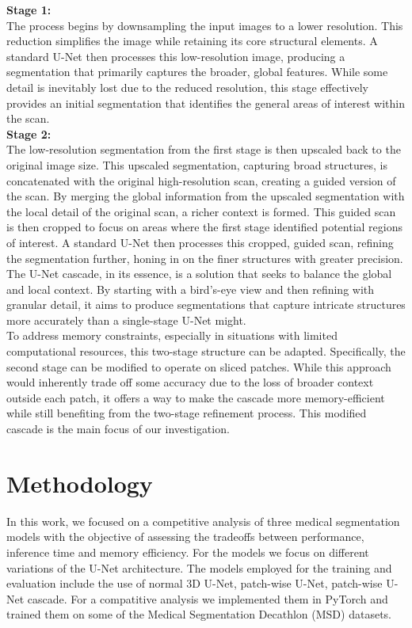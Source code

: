\noindent\textbf{Stage 1:}\\
The process begins by downsampling the input images to a lower resolution. This reduction simplifies the image while retaining its core structural elements.
A standard U-Net then processes this low-resolution image, producing a segmentation that primarily captures the broader, global features.
While some detail is inevitably lost due to the reduced resolution,
this stage effectively provides an initial segmentation that identifies the general areas of interest within the scan.\\[1ex]
\noindent\textbf{Stage 2:}\\
The low-resolution segmentation from the first stage is then upscaled back to the original image size. This upscaled segmentation, capturing broad structures,
is concatenated with the original high-resolution scan, creating a guided version of the scan.
By merging the global information from the upscaled segmentation with the local detail of the original scan, a richer context is formed.
This guided scan is then cropped to focus on areas where the first stage identified potential regions of interest.
A standard U-Net then processes this cropped, guided scan, refining the segmentation further, honing in on the finer structures with greater precision.\\[1ex]
The U-Net cascade, in its essence, is a solution that seeks to balance the global and local context.
By starting with a bird's-eye view and then refining with granular detail,
it aims to produce segmentations that capture intricate structures more accurately than a single-stage U-Net might.\\[1ex]
To address memory constraints, especially in situations with limited computational resources, this two-stage structure can be adapted. Specifically,
the second stage can be modified to operate on sliced patches.
While this approach would inherently trade off some accuracy due to the loss of broader context outside each patch,
it offers a way to make the cascade more memory-efficient while still benefiting from the two-stage refinement process.
This modified cascade is the main focus of our investigation.

\chapter{Methodology}
In this work, we focused on a competitive analysis of three medical segmentation models with the objective of assessing the tradeoffs between performance, inference time and memory efficiency.
For the models we focus on different variations of the U-Net architecture. The models employed for the training and evaluation include the use of normal 3D U-Net, patch-wise U-Net,
patch-wise U-Net cascade. For a compatitive analysis we implemented them in PyTorch and trained them on some of the Medical Segmentation Decathlon (MSD) datasets.\\

